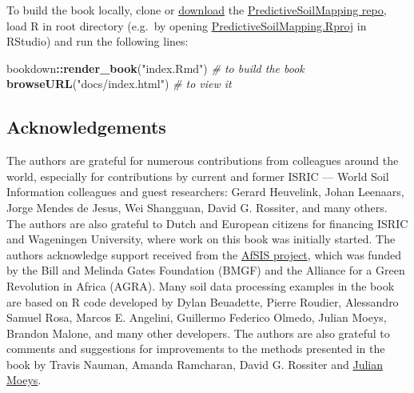 \documentclass[graybox,natbib,nospthms]{svmono}
\newenvironment{Shaded}{\begin{snugshade}}{\end{snugshade}}
\newcommand{\KeywordTok}[1]{\textcolor[rgb]{0.13,0.29,0.53}{\textbf{#1}}}
\newcommand{\StringTok}[1]{\textcolor[rgb]{0.31,0.60,0.02}{#1}}
\newcommand{\CommentTok}[1]{\textcolor[rgb]{0.56,0.35,0.01}{\textit{#1}}}
\newcommand{\OperatorTok}[1]{\textcolor[rgb]{0.81,0.36,0.00}{\textbf{#1}}}
\newcommand{\NormalTok}[1]{#1}
\begin{document}
To build the book locally, clone or
\href{https://github.com/envirometrix/PredictiveSoilMapping/archive/master.zip}{download}
the
\href{https://github.com/envirometrix/PredictiveSoilMapping/}{PredictiveSoilMapping
repo}, load R in root directory (e.g.~by opening
\href{https://github.com/envirometrix/PredictiveSoilMapping/blob/master/PredictiveSoilMapping.Rproj}{PredictiveSoilMapping.Rproj}
in RStudio) and run the following lines:

\begin{Shaded}
\begin{Highlighting}[]
\NormalTok{bookdown}\OperatorTok{::}\KeywordTok{render_book}\NormalTok{(}\StringTok{"index.Rmd"}\NormalTok{) }\CommentTok{# to build the book}
\KeywordTok{browseURL}\NormalTok{(}\StringTok{"docs/index.html"}\NormalTok{) }\CommentTok{# to view it}
\end{Highlighting}
\end{Shaded}

\subsection*{Acknowledgements}\label{acknowledgements}

The authors are grateful for numerous contributions from colleagues
around the world, especially for contributions by current and former
ISRIC --- World Soil Information colleagues and guest researchers:
Gerard Heuvelink, Johan Leenaars, Jorge Mendes de Jesus, Wei Shangguan,
David G. Rossiter, and many others. The authors are also grateful to
Dutch and European citizens for financing ISRIC and Wageningen
University, where work on this book was initially started. The authors
acknowledge support received from the
\href{http://africasoils.net}{AfSIS project}, which was funded by the
Bill and Melinda Gates Foundation (BMGF) and the Alliance for a Green
Revolution in Africa (AGRA). Many soil data processing examples in the
book are based on R code developed by Dylan Beuadette, Pierre Roudier,
Alessandro Samuel Rosa, Marcos E. Angelini, Guillermo Federico Olmedo,
Julian Moeys, Brandon Malone, and many other developers. The authors are
also grateful to comments and suggestions for improvements to the
methods presented in the book by Travis Nauman, Amanda Ramcharan, David
G. Rossiter and \href{http://julienmoeys.info}{Julian Moeys}.
\end{document}
